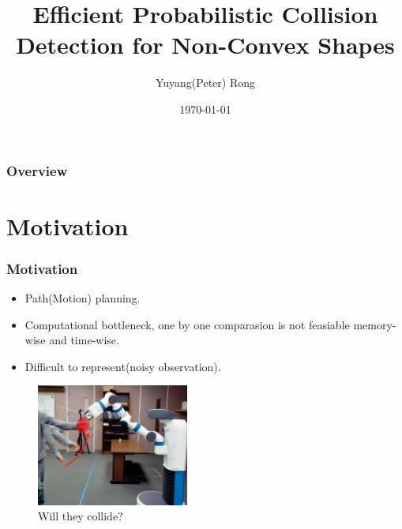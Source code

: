 \documentclass{beamer}
\title[Non-Convex shape Collision Detection]{Efficient Probabilistic Collision Detection for Non-Convex Shapes} %
\author{Yuyang(Peter) Rong} %
\institute[UCDavis] %
{
University of California, Davis \\ %
\medskip
\textit{PtrRong@ucdavis.edu} %
}
\date{\today} %
\begin{document}
\begin{frame}
	\titlepage %
\end{frame}

\begin{frame}
	\frametitle{Overview} %
	\tableofcontents %
\end{frame}


\section{Motivation} %


\begin{frame}
	\frametitle{Motivation}
	\begin{itemize}
		\item Path(Motion) planning.
		\item Computational bottleneck, one by one comparasion is not feasiable memory-wise and time-wise.
		\item Difficult to represent(noisy observation).
	\end{itemize}
	\begin{figure}
		\includegraphics[width=5cm]{imgs/PS.png}
		\caption{Will they collide?}
	\end{figure}
\end{frame}
\end{document}
